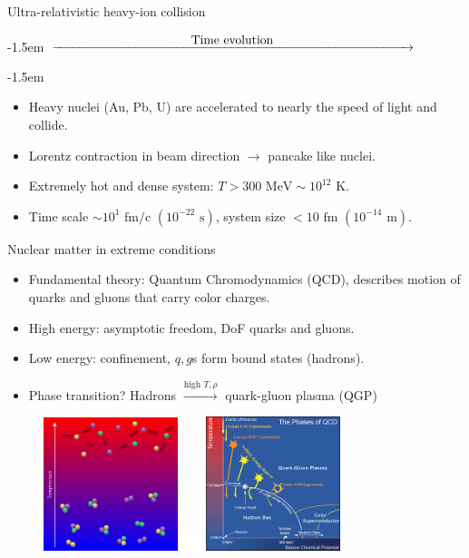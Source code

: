 \documentclass[11pt]{beamer}
\begin{document}
\begin{frame}{Ultra-relativistic heavy-ion collision}
\begin{center}
  	\kern-1.5em
  	$\xrightarrow{\makebox[10cm]{Time evolution}}$
  	\end{center}
  	\kern-1.5em
\begin{itemize}
\item Heavy nuclei (Au, Pb, U) are accelerated to nearly the speed of light and collide.
\item Lorentz contraction in beam direction $\rightarrow$ pancake like nuclei.
\item Extremely hot and dense system: $T > 300 \textrm{ MeV} \sim 10^{12} \textrm{ K}$. 
\item Time scale $\sim 10^1 \textrm{ fm/c } (10^{-22} \textrm{ s})$, system size $< 10 \textrm{ fm } (10^{-14}\textrm{ m})$.
\end{itemize}
\end{frame}

\begin{frame}{Nuclear matter in extreme conditions}
\begin{itemize}
\item Fundamental theory: Quantum Chromodynamics (QCD), describes motion of {\color{red}quarks} and {\color{red}gluons} that carry color charges.
\item High energy: asymptotic freedom, DoF quarks and gluons.
\item Low energy: confinement, {\color{red} $q,g$}s form bound states (hadrons).
\item Phase transition? Hadrons	$\xrightarrow{\textrm{high } T, \rho}$ quark-gluon plasma (QGP)
\end{itemize}
    \begin{figure}
   	\begin{center}
	\includegraphics[width=0.35\textwidth]{pics/deconfine.png} 
	\includegraphics[width=0.05\textwidth]{pics/place_holder.png}
	\includegraphics[width=0.35\textwidth]{pics/phase_diagram.jpg} 
	\end{center} 	
  	\end{figure}
\end{frame}
\end{document}
